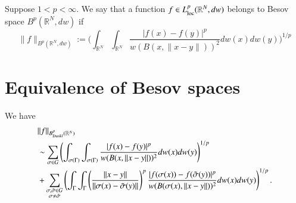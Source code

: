 \documentclass[12pt]{amsart}
\begin{document}
\begin{definition}{\rm\label{beso}
Suppose $1< p< \infty$. We say that a  function $f\in L^p_{{\rm loc}}(\mathbb{R}^{N},dw)$ belongs to Besov space $B^p(\mathbb{R}^N,dw)$ if
$$\|f\|_{B^p(\mathbb{R}^N,dw)}:=\Bigg({\int_{\mathbb{R}^N}\int_{\mathbb{R}^N}\frac{|f(x)-f(y)|^p}{w(B(x,\|x-y\|))^2}}dw(x)dw(y)\Bigg)^{1/p}$$}
\end{definition}
\section{Equivalence of Besov spaces}
\begin{lemma}\label{lem1}
We have
\begin{align*}
&\|f\|_{B^{p}_{{\rm Dunkl}}(\mathbb{R}^N)}\\
&\sim  \sum_{\sigma\in G} \left(\int_{\sigma(\Gamma)}\int_{\sigma(\Gamma)}\frac{|f(x)-f(y)|^p}{w(B(x,\|x-y\|))^2}dw(x)dw(y)\right)^{1/p}\\
&+\sum_{\substack{\sigma,\tilde{\sigma}\in G\\ \sigma\neq \tilde{\sigma}}}\left(\int_{\Gamma}\int_{\Gamma}\left(\frac{\|x-y\|}{\|\sigma(x)-\tilde{\sigma}(y)\|}\right)^{p}\frac{|f(\sigma(x))-f(\tilde{\sigma}(y))|^p}{w(B(\sigma(x),\|x-y\|))^2}dw(x)dw(y)\right)^{1/p}.
\end{align*}
\end{lemma}
\end{document}
